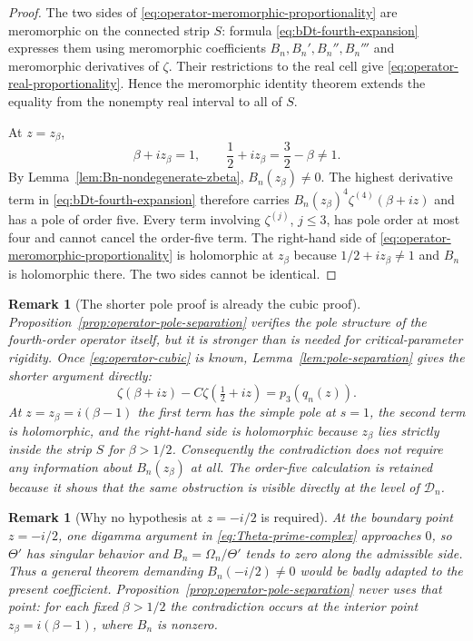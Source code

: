 \documentclass[11pt]{amsart}
\numberwithin{equation}{section}
\newtheorem{remark}[theorem]{Remark}
\begin{document}
\begin{proof}
The two sides of \eqref{eq:operator-meromorphic-proportionality} are
meromorphic on the connected strip $S$: formula
\eqref{eq:bDt-fourth-expansion} expresses them using meromorphic coefficients
$B_n,B_n',B_n'',B_n'''$ and meromorphic derivatives of $\zeta$.  Their
restrictions to the real cell give \eqref{eq:operator-real-proportionality}.
Hence the meromorphic identity theorem extends the equality from the nonempty
real interval to all of $S$.

At $z=z_\beta$,
\begin{equation}
 \beta+iz_\beta=1,
 \qquad
 \frac12+iz_\beta=\frac32-\beta\neq1.
 \label{eq:operator-pole-arguments}
\end{equation}
By Lemma~\ref{lem:Bn-nondegenerate-zbeta}, $B_n(z_\beta)\neq0$.  The
highest derivative term in \eqref{eq:bDt-fourth-expansion} therefore carries
$B_n(z_\beta)^4\zeta^{(4)}(\beta+iz)$ and has a pole of order five.  Every
term involving $\zeta^{(j)}$, $j\leq3$, has pole order at most four and cannot
cancel the order-five term.  The right-hand side of
\eqref{eq:operator-meromorphic-proportionality} is holomorphic at $z_\beta$
because $1/2+iz_\beta\neq1$ and $B_n$ is holomorphic there.  The two sides
cannot be identical.
\end{proof}

\begin{remark}[The shorter pole proof is already the cubic proof]
\label{rem:shorter-cubic-pole-proof}
Proposition~\ref{prop:operator-pole-separation} verifies the pole structure of
the fourth-order operator itself, but it is stronger than is needed for
critical-parameter rigidity.  Once
\eqref{eq:operator-cubic} is known, Lemma~\ref{lem:pole-separation} gives the
shorter argument directly:
\begin{equation}
 \zeta(\beta+iz)-C\zeta(\tfrac12+iz)
 =p_3(q_n(z)).
 \label{eq:short-cubic-pole-identity}
\end{equation}
At $z=z_\beta=i(\beta-1)$ the first term has the simple pole at $s=1$, the
second term is holomorphic, and the right-hand side is holomorphic because
$z_\beta$ lies strictly inside the strip $S$ for $\beta>1/2$.
Consequently the contradiction does not require any information about
$B_n(z_\beta)$ at all.  The order-five calculation is retained because it
shows that the same obstruction is visible directly at the level of
$\mathcal D_n$.
\end{remark}

\begin{remark}[Why no hypothesis at $z=-i/2$ is required]
\label{rem:no-B-critical-pole-needed}
At the boundary point $z=-i/2$, one digamma argument in
\eqref{eq:Theta-prime-complex} approaches $0$, so $\Theta'$ has singular
behavior and $B_n=\Omega_n/\Theta'$ tends to zero along the admissible side.
Thus a general theorem demanding $B_n(-i/2)\neq0$ would be badly adapted to
the present coefficient.  Proposition~\ref{prop:operator-pole-separation}
never uses that point: for each fixed $\beta>1/2$ the contradiction occurs at
the interior point $z_\beta=i(\beta-1)$, where $B_n$ is nonzero.
\end{remark}
\end{document}
